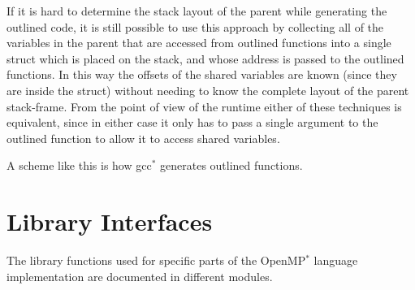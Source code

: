 If it is hard to determine the stack layout of the parent while generating the outlined code, it is still possible to use this approach by collecting all of the variables in the parent that are accessed from outlined functions into a single {\ttfamily struct} which is placed on the stack, and whose address is passed to the outlined functions. In this way the offsets of the shared variables are known (since they are inside the struct) without needing to know the complete layout of the parent stack-\/frame. From the point of view of the runtime either of these techniques is equivalent, since in either case it only has to pass a single argument to the outlined function to allow it to access shared variables.

A scheme like this is how gcc$^{\mbox{$\ast$}}$  generates outlined functions.\hypertarget{index_SEC_INTERFACES}{}\section{Library Interfaces}\label{index_SEC_INTERFACES}
The library functions used for specific parts of the Open\-M\-P$^{\mbox{$\ast$}}$  language implementation are documented in different modules.


